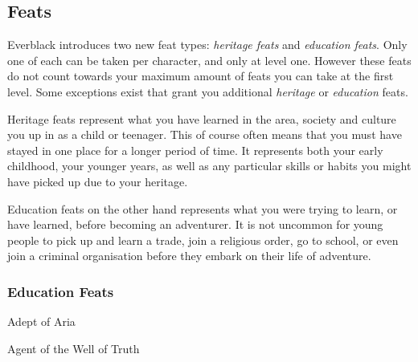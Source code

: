 \subsection{Feats}

Everblack introduces two new feat types: \emph{heritage feats} and
\emph{education feats}. Only one of each can be taken per character, and only
at level one. However these feats do not count towards your maximum amount of
feats you can take at the first level. Some exceptions exist that grant you
additional \emph{heritage} or \emph{education} feats.

Heritage feats represent what you have learned in the area, society and
culture you up in as a child or teenager. This of course often means that you
must have stayed in one place for a longer period of time. It represents both
your early childhood, your younger years, as well as any particular skills or
habits you might have picked up due to your heritage.

Education feats on the other hand represents what you were trying to learn,
or have learned, before becoming an adventurer. It is not uncommon for young
people to pick up and learn a trade, join a religious order, go to school,
or even join a criminal organisation before they embark on their life of
adventure.

\subsubsection*{Education Feats}

\begin{35efeat}{Adept of Aria}
  \srdeducationfeat
\end{35efeat}

\begin{35efeat}{Agent of the Well of Truth}
  \srdeducationfeat
\end{35efeat}

